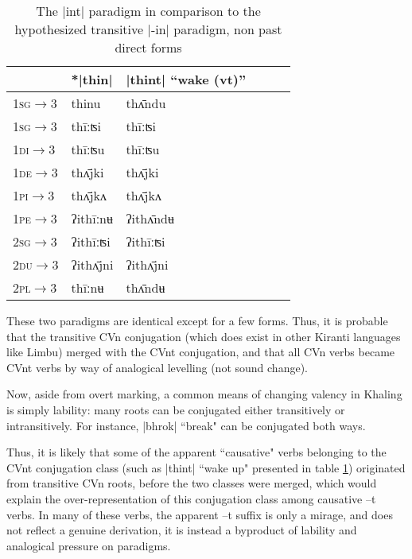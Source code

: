 \documentclass[oldfontcommands,oneside,a4paper,11pt]{article}
\newcommand{\ipa}[1]{{\phon #1}} %
\newcommand{\grise}[1]{\cellcolor{lightgray}\textbf{#1}}
\newcommand{\dhatu}[1]{|\ipa{#1}|}
\begin{document}
\begin{table}[h]
\caption{The \dhatu{int} paradigm in comparison to the hypothesized transitive |-in| paradigm, non past direct forms} \label{tab:int} \centering
\begin{tabular}{llllll}
\toprule
\textsc{} &	*\dhatu{thin}  &  	\dhatu{thint} ``wake (vt)''  \\  		
\midrule
\textsc{1sg$\rightarrow$3} &	\ipa{*thinu} \grise{}  &  	\ipa{thʌ̄ndu}  \\  		
\textsc{1sg$\rightarrow$3} &	\ipa{thīːʦi}  &  	\ipa{thīːʦi}  \\  		
\textsc{1di$\rightarrow$3} &	\ipa{thīːʦu}  &  	\ipa{thīːʦu}  \\  		
\textsc{1de$\rightarrow$3} &	\ipa{thʌ̄jki}  &  	\ipa{thʌ̄jki}  \\  		
\textsc{1pi$\rightarrow$3} &	\ipa{thʌ̄jkʌ}  &  	\ipa{thʌ̄jkʌ}  \\  		
\textsc{1pe$\rightarrow$3} &	\ipa{*ʔithīːnʉ}\grise{}   &  	\ipa{ʔithʌ̄ndʉ}  \\  		
\textsc{2sg$\rightarrow$3} &	\ipa{ʔithīːʦi}  &  	\ipa{ʔithīːʦi}  \\  		
\textsc{2du$\rightarrow$3} &	\ipa{ʔithʌ̄jni}  &  	\ipa{ʔithʌ̄jni}  \\  		
\textsc{2pl$\rightarrow$3} &	\ipa{*thīːnʉ}\grise{}   &  	\ipa{thʌ̄ndʉ}  \\  		
\bottomrule
\end{tabular}
\end{table}
These two paradigms are identical except for a few forms. Thus, it is probable that the transitive CVn conjugation (which does exist in other Kiranti languages like Limbu) merged with the CVnt conjugation, and that all CVn verbs became CVnt verbs  by way of analogical levelling (not sound change).

Now, aside from overt marking, a common means of changing valency in Khaling is simply lability: many roots can be conjugated either transitively or intransitively. For instance, \dhatu{bhrok} ``break" can be conjugated both ways. 


Thus, it is likely that some of the apparent ``causative" verbs belonging to the CVnt conjugation class (such as \dhatu{thint} ``wake up" presented in table \ref{tab:int}) originated from transitive CVn roots, before the two classes were merged, which would explain the over-representation of this conjugation class among causative \ipa{--t} verbs. In many of these verbs, the apparent --t suffix is only a mirage, and does not reflect a genuine derivation, it is instead a byproduct of lability and analogical pressure on paradigms.
\end{document}
